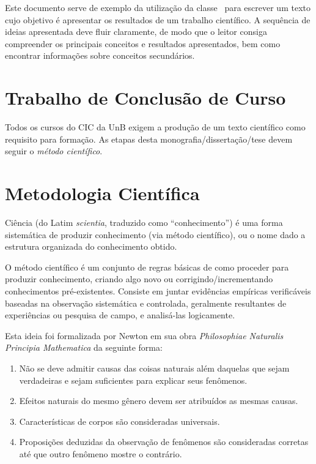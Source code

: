 Este documento serve de exemplo da utilização da classe \unbcic\ para escrever
um texto cujo objetivo é apresentar os resultados de um trabalho científico. A
sequência de ideias apresentada deve fluir claramente, de modo que o leitor
consiga compreender os principais conceitos e resultados apresentados, bem como
encontrar informações sobre conceitos secundários.


\section{Trabalho de Conclusão de Curso}%
Todos os cursos do \acrfull{CIC} da \acrfull{UnB} exigem a produção de um
texto científico como requisito para formação. %
As etapas desta monografia/dissertação/tese devem seguir o \emph{método científico}.

\section{Metodologia Científica}%
Ciência (do Latim \emph{scientia}, traduzido como ``conhecimento'') é uma forma
sistemática de produzir conhecimento (via método científico), ou o nome dado a
estrutura organizada do conhecimento obtido.

O método científico é um conjunto de regras básicas de como proceder para produzir
conhecimento, criando algo novo ou corrigindo/incrementando conhecimentos
pré-existentes. Consiste em juntar evidências empíricas verificáveis baseadas na
observação sistemática e controlada, geralmente resultantes de experiências ou
pesquisa de campo, e analisá-las logicamente.

Esta ideia foi formalizada por Newton em sua obra \emph{Philosophiae Naturalis
Principia Mathematica} \cite{newton1833philosophiae} da seguinte forma:
\begin{enumerate}
	\item Não se deve admitir causas das coisas naturais além daquelas
	que sejam verdadeiras e sejam suficientes para explicar seus fenômenos.
	\item Efeitos naturais do mesmo gênero devem ser atribuídos as mesmas causas.
	\item Características de corpos são consideradas universais.
	\item Proposições deduzidas da observação de fenômenos são
	consideradas corretas até que outro fenômeno mostre o contrário.
\end{enumerate}%

